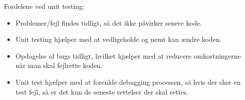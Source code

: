 \vspace {5mm}

Fordelene ved unit testing:
\begin{itemize}
\item Problemer/fejl findes tidligt, så det ikke påvirker senere kode.
\item Unit testing hjælper med at vedligeholde og nemt kan ændre koden.
\item Opdagelse af bugs tidligt, hvilket hjælper med at reducere omkostningerne når man skal fejlrette koden.
\item Unit test hjælper med at forenkle debugging processen, så hvis der sker en test fejl, så er det kun de seneste rettelser der skal rettes.
\end{itemize}




